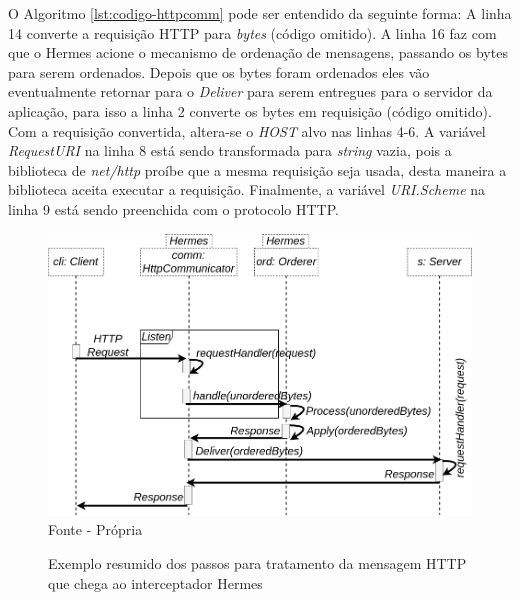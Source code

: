 \begin{minipage}{\textwidth}
\begin{center}

\end{center}
\end{minipage}

O Algoritmo \ref{lst:codigo-httpcomm} pode ser entendido da seguinte forma: A linha 14 converte a requisição \gls{HTTP} para \textit{bytes} (código omitido). A linha 16 faz com que o Hermes acione o mecanismo de ordenação de mensagens, passando os bytes para serem ordenados. Depois que os bytes foram ordenados eles vão eventualmente retornar para o \textit{Deliver} para serem entregues para o servidor da aplicação, para isso a linha 2 converte os bytes em requisição (código omitido). Com a requisição convertida, altera-se o \textit{HOST} alvo nas linhas 4-6. A variável \textit{RequestURI} na linha 8 está sendo transformada para \textit{string} vazia, pois a biblioteca de \textit{net/http} proíbe que a mesma requisição seja usada, desta maneira a biblioteca aceita executar a requisição. Finalmente, a variável \textit{URI.Scheme} na linha 9 está sendo preenchida com o protocolo \gls{HTTP}.

\begin{figure}[!htb]
\centering
\caption{Exemplo resumido dos passos para tratamento da mensagem HTTP que chega ao interceptador Hermes}
\includegraphics[width=\linewidth]{figures/deliver-listen-logic.drawio.png}
{\flushleft Fonte - Própria}
\label{fig:deliver-listen-logic}
\end{figure}

